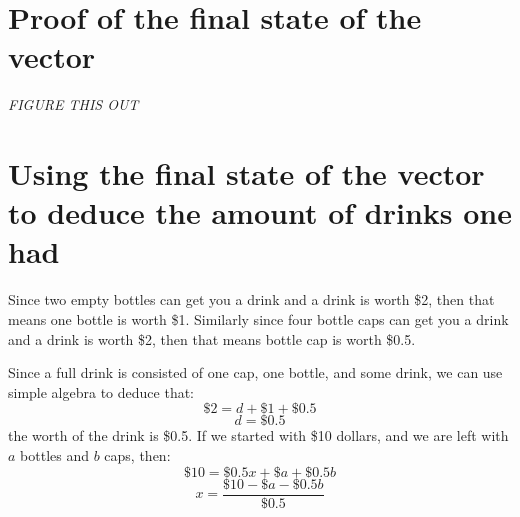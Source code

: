 \documentclass[letterpaper, 12pt]{article}
\newcommand{\todo}[1]{{\emph{\color{red}#1}}}
\begin{document}
\section{Proof of the final state of the vector}
\todo{FIGURE THIS OUT}
\section{Using the final state of the vector to deduce the amount of drinks one had}
\par Since two empty bottles can get you a drink and a drink is worth \$2, then that means one bottle is worth \$1.
Similarly since four bottle caps can get you a drink and a drink is worth \$2, then that means bottle cap is worth \$0.5.
\par Since a full drink is consisted of one cap, one bottle, and some drink, we can use simple algebra to deduce that:
\begin{equation}
	\$2 = d + \$1 + \$0.5
\end{equation}
\begin{equation}
	d = \$0.5
\end{equation}
the worth of the drink is \$0.5.
If we started with \$10 dollars, and we are left with $a$ bottles and $b$ caps, then:
\begin{equation}
	\$10 = \$0.5x + \$a + \$0.5b
\end{equation}
\begin{equation}
	x = \frac{\$10 - \$a - \$0.5b}{\$0.5}
\end{equation}
\end{document}
